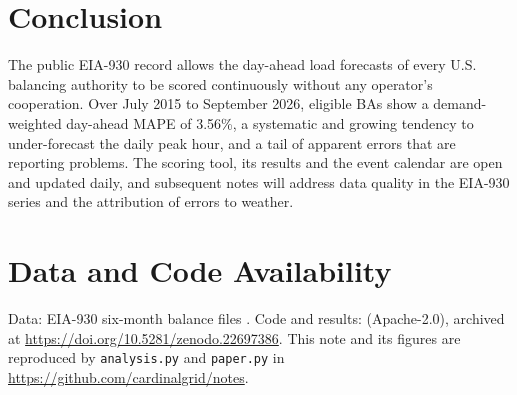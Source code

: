 \documentclass[conference]{IEEEtran}
\begin{document}
\section{Conclusion}
The public EIA-930 record allows the day-ahead load forecasts of every U.S. balancing authority to be scored continuously without any operator's cooperation. Over July 2015 to September 2026, eligible BAs show a demand-weighted day-ahead MAPE of 3.56\%, a systematic and growing tendency to under-forecast the daily peak hour, and a tail of apparent errors that are reporting problems. The scoring tool, its results and the event calendar are open and updated daily, and subsequent notes will address data quality in the EIA-930 series and the attribution of errors to weather.

\section*{Data and Code Availability}
Data: EIA-930 six-month balance files \cite{eia930monitor}. Code and results: \cite{guerra2026scorecard} (Apache-2.0), archived at \url{https://doi.org/10.5281/zenodo.22697386}. This note and its figures are reproduced by \texttt{analysis.py} and \texttt{paper.py} in \url{https://github.com/cardinalgrid/notes}.



\end{document}
